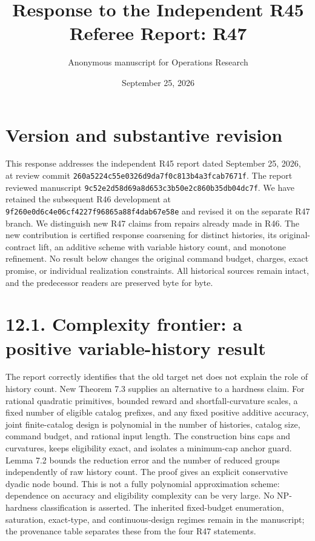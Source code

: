 \documentclass[11pt]{article}
\title{Response to the Independent R45 Referee Report: R47}
\author{Anonymous manuscript for Operations Research}
\date{September 25, 2026}
\begin{document}
\maketitle
\section*{Version and substantive revision}
This response addresses the independent R45 report dated September 25, 2026, at review commit \nolinkurl{260a5224c55e0326d9da7f0c813b4a3fcab7671f}. The report reviewed manuscript \nolinkurl{9c52e2d58d69a8d653c3b50e2c860b35db04dc7f}. We have retained the subsequent R46 development at \nolinkurl{9f260e0d6c4e06cf4227f96865a88f4dab67e58e} and revised it on the separate R47 branch. We distinguish new R47 claims from repairs already made in R46. The new contribution is certified response coarsening for distinct histories, its original-contract lift, an additive scheme with variable history count, and monotone refinement. No result below changes the original command budget, charges, exact promise, or individual realization constraints. All historical sources remain intact, and the predecessor readers are preserved byte for byte.

\section*{12.1. Complexity frontier: a positive variable-history result}
The report correctly identifies that the old target net does not explain the role of history count. New Theorem 7.3 supplies an alternative to a hardness claim. For rational quadratic primitives, bounded reward and shortfall-curvature scales, a fixed number of eligible catalog prefixes, and any fixed positive additive accuracy, joint finite-catalog design is polynomial in the number of histories, catalog size, command budget, and rational input length. The construction bins caps and curvatures, keeps eligibility exact, and isolates a minimum-cap anchor guard. Lemma 7.2 bounds the reduction error and the number of reduced groups independently of raw history count. The proof gives an explicit conservative dyadic node bound. This is not a fully polynomial approximation scheme: dependence on accuracy and eligibility complexity can be very large. No NP-hardness classification is asserted. The inherited fixed-budget enumeration, saturation, exact-type, and continuous-design regimes remain in the manuscript; the provenance table separates these from the four R47 statements.
\end{document}
